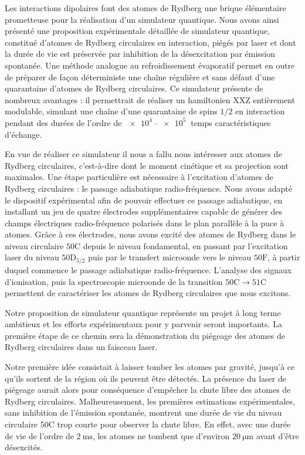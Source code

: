 Les interactions dipolaires font des atomes de Rydberg une \og brique élémentaire \fg{} prometteuse pour la réalisation d'un simulateur quantique.
Nous avons ainsi présenté une proposition expérimentale détaillée de simulateur quantique, constitué d'atomes de Rydberg circulaires en interaction, piégés par laser et dont la durée de vie est préservée par inhibition de la désexcitation par émission spontanée.
Une méthode analogue au refroidissement évaporatif permet en outre de préparer de façon déterministe une chaîne régulière et sans défaut d'une quarantaine d'atomes de Rydberg circulaires.
Ce simulateur présente de nombreux avantages : il permettrait de réaliser un hamiltonien $\mathrm{XXZ}$ entièrement modulable, simulant une chaîne d'une quarantaine de spins $1/2$ en interaction pendant des durées de l'ordre de $\SIrange{e4}{e5}{}$ temps caractéristiques d'échange.

En vue de réaliser ce simulateur il nous a fallu nous intéresser aux atomes de Rydberg circulaires, c'est-à-dire dont le moment cinétique et sa projection sont maximales.
Une étape particulière est nécessaire à l'excitation d'atomes de Rydberg circulaires : le passage adiabatique radio-fréquence.
Nous avons adapté le dispositif expérimental afin de pouvoir effectuer ce passage adiabatique, en installant un jeu de quatre électrodes supplémentaires capable de générer des champs électriques radio-fréquence polarisés dans le plan parallèle à la puce à atomes.
Grâce à ces électrodes, nous avons excité des atomes de Rydberg dans le niveau circulaire $\mathrm{50C}$ depuis le niveau fondamental, en passant par l'excitation laser du niveau $\mathrm{50D_{5/2}}$ puis par le transfert microonde vers le niveau $\mathrm{50F}$, à partir duquel commence le passage adiabatique radio-fréquence.
L'analyse des signaux d'ionisation, puis la spectroscopie microonde de la transition $\mathrm{50C \rightarrow 51C}$ permettent de caractériser les atomes de Rydberg circulaires que nous excitons.

\bigskip
Notre proposition de simulateur quantique représente un projet à long terme ambitieux et les efforts expérimentaux pour y parvenir seront importants.
La première étape de ce chemin sera la démonstration du piégeage des atomes de Rydberg circulaires dans un faisceau laser.

Notre première idée consistait à laisser tomber les atomes par gravité, jusqu'à ce qu'ils sortent de la région où ils peuvent être détectés.
La présence du laser de piégeage aurait alors pour conséquence d'empêcher la chute libre des atomes de Rydberg circulaires.
Malheureusement, les premières estimations expérimentales, sans inhibition de l'émission spontanée, montrent une durée de vie du niveau circulaire $\mathrm{50C}$ trop courte pour observer la chute libre.
En effet, avec une durée de vie de l'ordre de $\SI{2}{\ms}$, les atomes ne tombent que d'environ $\SI{20}{\um}$ avant d'être désexcités.

